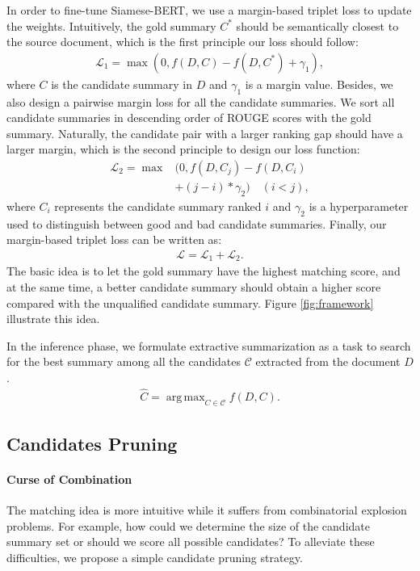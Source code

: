 In order to fine-tune Siamese-BERT, we use a margin-based triplet loss to update the weights.
Intuitively, the gold summary $C^*$ should be semantically closest to the source document, which is the first principle our loss should follow:
\begin{align}
    \mathcal{L}_{1} = \max(0,f(D,C)-f(D,C^*) +\gamma_1),
\end{align}
where $C$ is the candidate summary in $D$ and $\gamma_1$ is a margin value. Besides, we also design a pairwise margin loss for all the candidate summaries. We sort all candidate summaries in descending order of ROUGE scores with the gold summary. Naturally, the candidate pair with a larger ranking gap should have a larger margin, which is the second principle to design our loss function:
\begin{equation}
\begin{aligned}
    \mathcal{L}_{2} = \max&(0, f(D,C_j)-f(D,C_i) \\
    &+(j-i)*\gamma_2) \quad  (i < j),
\end{aligned}
\end{equation}
where $C_i$ represents the candidate summary ranked $i$ and $\gamma_2$ is a hyperparameter used to distinguish between good and bad candidate summaries. Finally, our margin-based triplet loss can be written as:
\begin{align}
    \mathcal{L} = \mathcal{L}_{1} + \mathcal{L}_{2}.
\end{align}
The basic idea is to let the gold summary have the highest matching score, and at the same time,  a better candidate summary should obtain a higher score compared with the unqualified candidate summary. Figure \ref{fig:framework} illustrate this idea.

In the inference phase, we formulate extractive summarization as a task to search for the best summary among all the candidates $\mathcal{C}$ extracted from the document $D$.
\begin{align}
    \hat{C} = \mathop{\arg\,\max}_{C\in \mathcal{C}} f(D, C). \label{eq:search}
\end{align}

\subsection{Candidates Pruning}

\paragraph{Curse of Combination}
The matching idea is more intuitive while it suffers from combinatorial explosion problems. For example, how could we determine the size of the candidate summary set or should we score all possible candidates?
To alleviate these difficulties, we propose a simple candidate pruning strategy.

